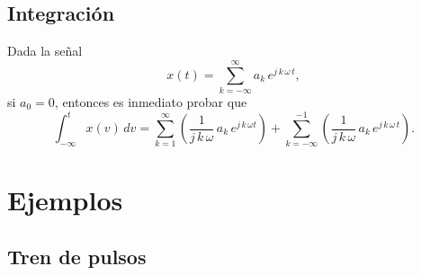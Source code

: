 \subsection{Integraci\'{o}n}

Dada la se\~{n}al 
\begin{equation}
x(t) = \sum_{k=-\infty }^{\infty } a_{k} \, e^{j \, k \, \omega \, t},
\end{equation}
si $a_{0}=0$, entonces es inmediato probar que
\begin{equation}
\int_{-\infty }^{t} x\left( v\right) \, dv =
\sum_{k=1}^{\infty }\left( \frac{1}{j \, k \, \omega } \, a_{k} \, e^{j
    \, k \, \omega t} \right) + \sum_{k=-\infty }^{-1}\left(
  \frac{1}{j \, k \, \omega } \, a_{k} \, e^{j \, k \, \omega \, t}\right) .
\end{equation}

\section{Ejemplos}

\subsection{Tren de pulsos \label{tren.de.pulsos}}

